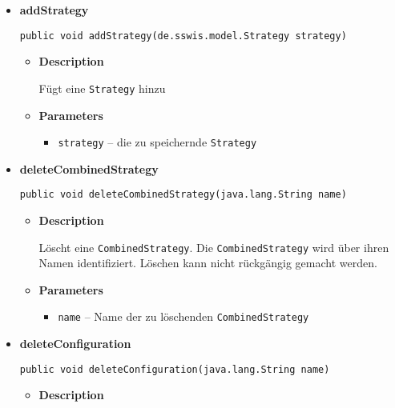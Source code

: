 {{{{{{{{\begin{itemize}
{\begin{itemize}
{Fügt eine \texttt{\small Initialization} hinzu.
}
\item{
{\bf  Parameters}
  \begin{itemize}
   \item{
\texttt{initialization} -- die zu speichernde \texttt{\small Initialization}}
  \end{itemize}
}%
\end{itemize}
}%
\item{ 
\hypertarget{de.sswis.controller.ModelProvider.addStrategy(de.sswis.model.Strategy)}{{\bf  addStrategy}\\}
\begin{lstlisting}[frame=none]
public void addStrategy(de.sswis.model.Strategy strategy)\end{lstlisting} %
\begin{itemize}
\item{
{\bf  Description}

Fügt eine \texttt{\small Strategy} hinzu
}
\item{
{\bf  Parameters}
  \begin{itemize}
   \item{
\texttt{strategy} -- die zu speichernde \texttt{\small Strategy}}
  \end{itemize}
}%
\end{itemize}
}%
\item{ 
\hypertarget{de.sswis.controller.ModelProvider.deleteCombinedStrategy(java.lang.String)}{{\bf  deleteCombinedStrategy}\\}
\begin{lstlisting}[frame=none]
public void deleteCombinedStrategy(java.lang.String name)\end{lstlisting} %
\begin{itemize}
\item{
{\bf  Description}

Löscht eine \texttt{\small CombinedStrategy}. Die \texttt{\small CombinedStrategy} wird über ihren Namen identifiziert. Löschen kann nicht rückgängig gemacht werden.
}
\item{
{\bf  Parameters}
  \begin{itemize}
   \item{
\texttt{name} -- Name der zu löschenden \texttt{\small CombinedStrategy}}
  \end{itemize}
}%
\end{itemize}
}%
\item{ 
\hypertarget{de.sswis.controller.ModelProvider.deleteConfiguration(java.lang.String)}{{\bf  deleteConfiguration}\\}
\begin{lstlisting}[frame=none]
public void deleteConfiguration(java.lang.String name)\end{lstlisting} %
\begin{itemize}
\item{
{\bf  Description}

}
\end{itemize}}
\end{itemize}}}}}}}}}
